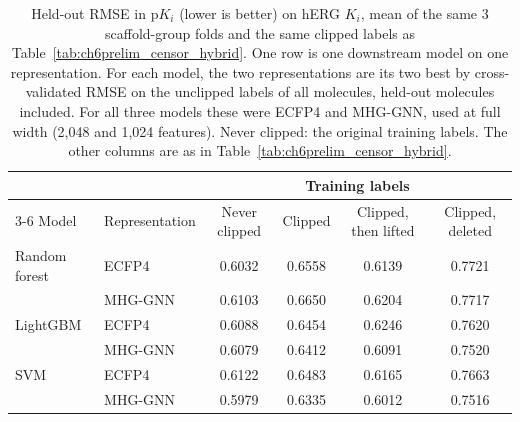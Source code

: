 \begin{table}[htbp]
\centering
\small
\begin{tabular}{@{}llcccc@{}}
\toprule
 & & \multicolumn{4}{c}{Training labels} \\
\cmidrule(l){3-6}
Model & Representation & Never clipped & Clipped & Clipped, then lifted & Clipped, deleted \\
\midrule
Random forest & ECFP4 & 0.6032 & 0.6558 & 0.6139 & 0.7721 \\
 & MHG-GNN & 0.6103 & 0.6650 & 0.6204 & 0.7717 \\
\midrule
LightGBM & ECFP4 & 0.6088 & 0.6454 & 0.6246 & 0.7620 \\
 & MHG-GNN & 0.6079 & 0.6412 & 0.6091 & 0.7520 \\
\midrule
SVM & ECFP4 & 0.6122 & 0.6483 & 0.6165 & 0.7663 \\
 & MHG-GNN & 0.5979 & 0.6335 & 0.6012 & 0.7516 \\
\bottomrule
\end{tabular}
\caption[Correcting clipped labels on hERG $K_i$ in single representations]{Held-out RMSE in p$K_i$ (lower is better) on hERG $K_i$, mean of the same 3 scaffold-group folds and the same clipped labels as Table~\ref{tab:ch6prelim_censor_hybrid}. One row is one downstream model on one representation. For each model, the two representations are its two best by cross-validated RMSE on the unclipped labels of all molecules, held-out molecules included. For all three models these were ECFP4 and MHG-GNN, used at full width (2,048 and 1,024 features). Never clipped: the original training labels. The other columns are as in Table~\ref{tab:ch6prelim_censor_hybrid}.}
\label{tab:ch6prelim_censor_single}
\end{table}


